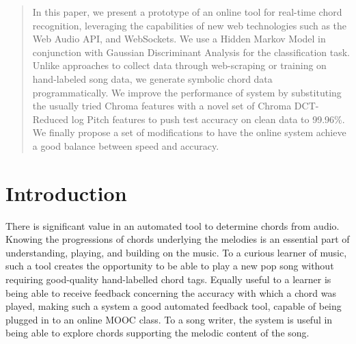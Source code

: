 \documentclass{article}
\begin{document}
 


\begin{abstract} 
In this paper, we present a prototype of an online tool for real-time chord recognition, leveraging the capabilities of new web technologies such as the Web Audio API, and WebSockets. We use a Hidden Markov Model in conjunction with Gaussian Discriminant Analysis for the classification task. Unlike approaches to collect data through web-scraping or training on hand-labeled song data, we generate symbolic chord data programmatically. We improve the performance of system by substituting the usually tried Chroma features with a novel set of Chroma DCT-Reduced log Pitch features to push test accuracy on clean data to 99.96\%. We finally propose a set of modifications to have the online system achieve a good balance between speed and accuracy.
\end{abstract} 

\section{Introduction}
\label{intro}
There is significant value in an automated tool to determine chords from audio. Knowing the progressions of chords underlying the melodies is an essential part of understanding, playing, and building on the music. To a curious learner of music, such a tool creates the opportunity to be able to play a new pop song without requiring good-quality hand-labelled chord tags. Equally useful to a learner is being able to receive feedback concerning the accuracy with which a chord was played, making such a system a good automated feedback tool, capable of being plugged in to an online MOOC class. To a song writer, the system is useful in being able to explore chords supporting the melodic content of the song.
\end{document}
